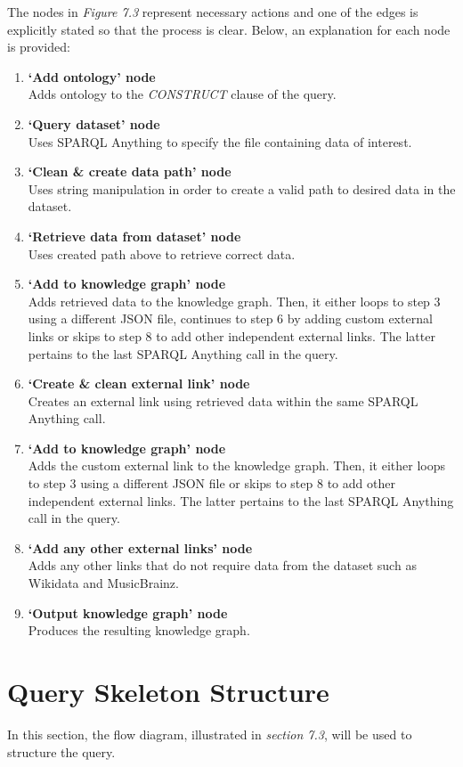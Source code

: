 The nodes in \textit{Figure 7.3} represent necessary actions and one of the edges is explicitly stated so that the process is clear. Below, an explanation for each node is provided: 

\begin{enumerate}
  \item \textbf{`Add ontology' node} \\ Adds ontology to the \textit{CONSTRUCT} clause of the query.
  \item \textbf{`Query dataset' node} \\ Uses SPARQL Anything to specify the file containing data of interest.
  \item \textbf{`Clean \& create data path' node} \\ Uses string manipulation in order to create a valid path to desired data in the dataset. 
  \item \textbf{`Retrieve data from dataset' node} \\ Uses created path above to retrieve correct data.
  \item \textbf{`Add to knowledge graph' node} \\ Adds retrieved data to the knowledge graph. Then, it either loops to step 3 using a different JSON file, continues to step 6 by adding custom external links or skips to step 8 to add other independent external links. The latter pertains to the last SPARQL Anything call in the query. 
  \item \textbf{`Create \& clean external link' node} \\ Creates an external link using retrieved data within the same SPARQL Anything call.
  \item \textbf{`Add to knowledge graph' node} \\ Adds the custom external link to the knowledge graph. Then, it either loops to step 3 using a different JSON file or skips to step 8 to add other independent external links. The latter pertains to the last SPARQL Anything call in the query. 
  \item \textbf{`Add any other external links' node} \\ Adds any other links that do not require data from the dataset such as Wikidata and MusicBrainz.
  \item \textbf{`Output knowledge graph' node} \\ Produces the resulting knowledge graph.
\end{enumerate}

\section{Query Skeleton Structure}
\hspace{0.5cm} In this section, the flow diagram, illustrated in \textit{section 7.3}, will be used to structure the query. 

